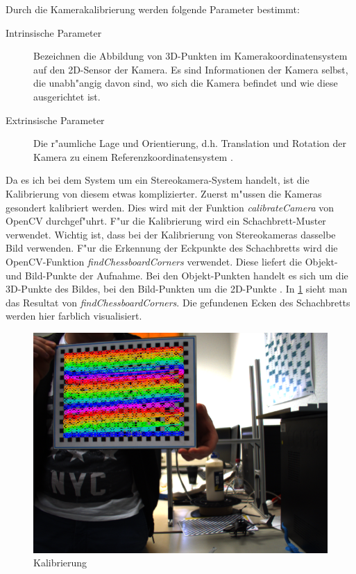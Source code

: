 \noindent Durch die Kamerakalibrierung werden folgende Parameter bestimmt:

\begin{description}
	\item[Intrinsische Parameter]
	Bezeichnen die Abbildung von 3D-Punkten im Kamerakoordinatensystem auf den 2D-Sensor der Kamera. Es sind Informationen der Kamera selbst, die unabh"angig davon sind, wo sich die Kamera befindet und wie diese ausgerichtet ist.
	
	\item[Extrinsische Parameter]
	Die r"aumliche Lage und Orientierung, d.h. Translation und Rotation der Kamera zu einem Referenzkoordinatensystem \cite{cal} \cite{extr}.
\end{description}

\noindent Da es ich bei dem System um ein Stereokamera-System handelt, ist die Kalibrierung von diesem etwas komplizierter.\newline
Zuerst m"ussen die Kameras gesondert kalibriert werden. Dies wird mit der Funktion \textit{calibrateCamera} von OpenCV durchgef"uhrt. F"ur die Kalibrierung wird ein Schachbrett-Muster verwendet. Wichtig ist, dass bei der Kalibrierung von Stereokameras dasselbe Bild verwenden. F"ur die Erkennung der Eckpunkte des Schachbretts wird die OpenCV-Funktion \textit{findChessboardCorners} verwendet. Diese liefert die Objekt- und Bild-Punkte der Aufnahme. Bei den Objekt-Punkten handelt es sich um die 3D-Punkte des Bildes, bei den Bild-Punkten um die 2D-Punkte \cite{OcvD}. In \ref{fig:chessboards} sieht man das Resultat von \textit{findChessboardCorners}. Die gefundenen Ecken des Schachbretts werden hier farblich visualisiert.

\begin{figure}[H]
	\includegraphics[scale=0.4]{bilder/calibration}
	\caption[Kalibrierung]{Kalibrierung}
	\label{fig:chessboards}
\end{figure}

